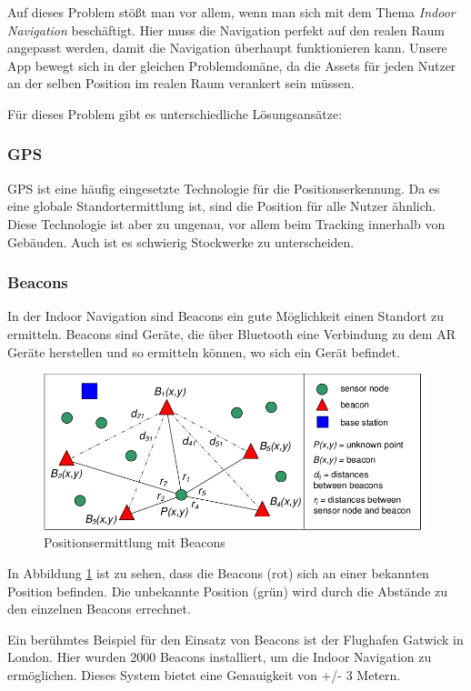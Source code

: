 \documentclass[titlepage, a4paper, 11pt]{scrartcl}
\begin{document}
  Auf dieses Problem stößt man vor allem, wenn man sich mit dem Thema \textit{Indoor Navigation} beschäftigt. Hier muss die Navigation perfekt auf den realen Raum angepasst werden, damit die Navigation überhaupt funktionieren kann.
  Unsere App bewegt sich in der gleichen Problemdomäne, da die Assets für jeden Nutzer an der selben Position im realen Raum verankert sein müssen.

  Für dieses Problem gibt es unterschiedliche Lösungsansätze:

  \subsubsection{GPS}
  GPS ist eine häufig eingesetzte Technologie für die Positionserkennung. Da es eine globale Standortermittlung ist, sind die Position für alle Nutzer ähnlich.
  Diese Technologie ist aber zu ungenau, vor allem beim Tracking innerhalb von Gebäuden. Auch ist es schwierig Stockwerke zu unterscheiden.

  \subsubsection{Beacons}
  In der Indoor Navigation sind Beacons ein gute Möglichkeit einen Standort zu ermitteln. Beacons sind Geräte, die über Bluetooth eine Verbindung zu dem AR Geräte herstellen und so ermitteln können, wo sich ein Gerät befindet.

  \begin{figure}[h]
    \centering
    \includegraphics[width=.6\textwidth]{beacons}
    \caption{Positionsermittlung mit Beacons \cite{beaconNetwork}}
    \label{Beacons}
  \end{figure}

  In Abbildung \ref{Beacons} ist zu sehen, dass die Beacons (rot) sich an einer bekannten Position befinden. Die unbekannte Position (grün) wird durch die Abstände zu den einzelnen Beacons errechnet.

  Ein berühmtes Beispiel für den Einsatz von Beacons ist der Flughafen Gatwick in London. Hier wurden 2000 Beacons installiert, um die Indoor Navigation zu ermöglichen. \cite{GatwickA64:online} 
  Dieses System bietet eine Genauigkeit von +/- 3 Metern.
  
\end{document}
